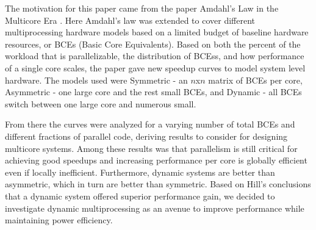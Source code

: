 The motivation for this paper came from the paper Amdahl's Law in the Multicore Era \cite{hill}. Here Amdahl's law was extended to cover different multiprocessing hardware models based on a limited budget of baseline hardware resources, or BCEs (Basic Core Equivalents). Based on both the percent of the workload that is parallelizable, the distribution of BCEss, and how performance of a single core scales, the paper gave new speedup curves to model system level hardware. The models used were Symmetric - an $n$x$n$ matrix of BCEs per core, Asymmetric - one large core and the rest small BCEs, and Dynamic - all BCEs switch between one large core and numerous small.

From there the curves were analyzed for a varying number of total BCEs and different fractions of parallel code, deriving results to consider for designing multicore systems. Among these results was that parallelism is still critical for achieving good speedups and increasing performance per core is globally efficient even if locally inefficient. Furthermore, dynamic systems are better than asymmetric, which in turn are better than symmetric. Based on Hill's conclusions that a dynamic system offered superior performance gain, we decided to investigate dynamic multiprocessing as an avenue to improve performance while maintaining power efficiency.